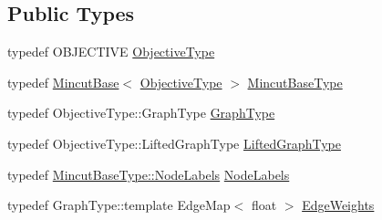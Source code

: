 \subsection*{Public Types}
\begin{DoxyCompactItemize}
\item 
typedef O\+B\+J\+E\+C\+T\+I\+V\+E \hyperlink{classnifty_1_1graph_1_1mincut_1_1RandomProposalGenerator_a335a453972c8a979d8816ba411fdac6d}{Objective\+Type}
\item 
typedef \hyperlink{classnifty_1_1graph_1_1MincutBase}{Mincut\+Base}$<$ \hyperlink{classnifty_1_1graph_1_1mincut_1_1RandomProposalGenerator_a335a453972c8a979d8816ba411fdac6d}{Objective\+Type} $>$ \hyperlink{classnifty_1_1graph_1_1mincut_1_1RandomProposalGenerator_a3b175c7a1e8c0cf1261ff898cb7e0c50}{Mincut\+Base\+Type}
\item 
typedef Objective\+Type\+::\+Graph\+Type \hyperlink{classnifty_1_1graph_1_1mincut_1_1RandomProposalGenerator_a35fd5e1c60ab0a7ab367cca002fa649f}{Graph\+Type}
\item 
typedef Objective\+Type\+::\+Lifted\+Graph\+Type \hyperlink{classnifty_1_1graph_1_1mincut_1_1RandomProposalGenerator_adbe69cbb29d33d9e650a7f1c12cc5c32}{Lifted\+Graph\+Type}
\item 
typedef \hyperlink{classnifty_1_1graph_1_1MincutBase_a9dc6555e37d38de23f194f87ca1497d5}{Mincut\+Base\+Type\+::\+Node\+Labels} \hyperlink{classnifty_1_1graph_1_1mincut_1_1RandomProposalGenerator_a52bd50ecf7237628151816d85004bad9}{Node\+Labels}
\item 
typedef Graph\+Type\+::template Edge\+Map$<$ float $>$ \hyperlink{classnifty_1_1graph_1_1mincut_1_1RandomProposalGenerator_afd3e463a9de30512e3fb44fc740d80f6}{Edge\+Weights}
\end{DoxyCompactItemize}
